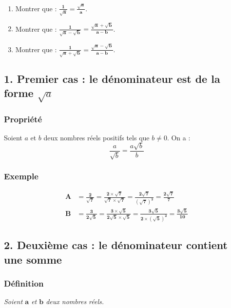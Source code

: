\documentclass[12pt,a4paper]{article}
\begin{document}
\vspace{0.3cm}
\begin{enumerate}[label=\textbf{\arabic*.}]
    \item Montrer que : $\mathbf{\frac{1}{\sqrt{a}} = \frac{\sqrt{a}}{a}}$.
    
    \vspace{0.3cm}
    \item Montrer que : $\mathbf{\frac{1}{\sqrt{a} - \sqrt{b}} = \frac{\sqrt{a} + \sqrt{b}}{a - b}}$.
    
    \vspace{0.3cm}
    \item Montrer que : $\mathbf{\frac{1}{\sqrt{a} + \sqrt{b}} = \frac{\sqrt{a} - \sqrt{b}}{a - b}}$.
\end{enumerate}
\subsection*{\color{myred} 1. Premier cas : le dénominateur est de la forme $\sqrt{a}$ }

\subsubsection*{\color{myred} Propriété }
Soient $a$ et $b$ deux nombres réels positifs tels que $b \neq 0$. On a :
\[
\frac{a}{\sqrt{b}} = \frac{a\sqrt{b}}{b}
\]
\subsubsection*{\color{myred} Exemple }
\begin{align*}
\mathbf{A} &\mathbf{{}= \frac{2}{\sqrt{7}} = \frac{2 \times \sqrt{7}}{\sqrt{7} \times \sqrt{7}} = \frac{2\sqrt{7}}{\left(\sqrt{7}\right)^2} = \frac{2\sqrt{7}}{7}} \\[0.4cm]
\mathbf{B} &\mathbf{{}= \frac{3}{2\sqrt{5}} = \frac{3 \times \sqrt{5}}{2\sqrt{5} \times \sqrt{5}} = \frac{3\sqrt{5}}{2 \times \left(\sqrt{5}\right)^2} = \frac{3\sqrt{5}}{10}}
\end{align*}
\subsection*{\color{myred} 2. Deuxième cas : le dénominateur contient une somme }

\subsubsection*{\color{myred} Définition}
\textit{Soient $\boldsymbol{a}$ et $\boldsymbol{b}$ deux nombres réels.}
\end{document}
